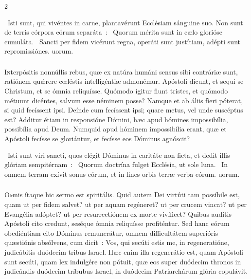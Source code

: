 \documentclass[9pt,twoside]{extarticle}
\begin{document}
\begin{multicols}{2}
{\begin{tightlist}{}
\item {}~Isti sunt, qui vivéntes in carne, plantavérunt Ecclésiam sánguine suo. Non sunt de terris córpora eórum separáta~: \textred{*}~Quorum mérita sunt in cælo glorióse cumuláta. ~Sancti per fidem vicérunt regna, operáti sunt justítiam, adépti sunt repromissiónes. uorum.
\end{tightlist}

\subsubsection*{\center {}}
\lettrine{I}nterpósitis nonnúllis rebus, quæ ex natúra humáni sensus sibi contráriæ sunt, ratiónem quǽrere cœléstis intelligéntiæ admonémur. Apóstoli dicunt, et sequi se Christum, et se ómnia reliquísse. Quómodo ígitur fiunt tristes, et quómodo métuunt dicéntes, salvum esse néminem posse? Namque et ab áliis fíeri póterat, si quid fecíssent ipsi. Deínde cum fecíssent ipsi; quare metus, vel unde suscéptus est? Additur étiam in responsióne Dómini, hæc apud hómines impossibília, possibília apud Deum. Numquid apud hóminem impossibília erant, quæ et Apóstoli fecísse se gloriántur, et fecísse eos Dóminus agnóscit?

\begin{tightlist}{}
\item {}~Isti sunt viri sancti, quos elégit Dóminus in caritáte non ficta, et dedit illis glóriam sempitérnam~: \textred{*}~Quorum doctrína fulget Ecclésia, ut sole luna. ~In omnem terram exívit sonus eórum, et in fines orbis terræ verba eórum. uorum.
\end{tightlist}

\subsubsection*{\center {}}
\lettrine{O}mnis ítaque hic sermo est spiritális. Quid autem Dei virtúti tam possíbile est, quam ut per fidem salvet? ut per aquam regéneret? ut per crucem vincat? ut per Evangélia adóptet? ut per resurrectiónem ex morte vivíficet? Quibus audítis Apóstoli cito credunt, seséque ómnia reliquísse profiténtur. Sed hanc eórum obediéntiam cito Dóminus remunerátur, omnem difficultátem superióris quæstiónis absólvens, cum dicit~: Vos, qui secúti estis me, in regeneratióne, judicábitis duódecim tribus Israel. Hæc enim illa regenerátio est, quam Apóstoli sunt secúti, quam lex indulgére non pótuit, quæ eos super duódecim thronos in judicándis duódecim tríbubus Israel, in duódecim Patriarchárum glória copulávit.

}
\end{multicols}
\end{document}
